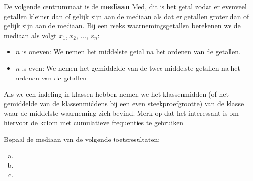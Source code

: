 \documentclass[12pt,twoside,a4paper]{article}
\begin{document}
De volgende centrummaat is de {\bf mediaan} Med, dit is het getal zodat er evenveel getallen kleiner dan of gelijk zijn aan de mediaan als dat er getallen groter dan of gelijk zijn aan de mediaan. Bij een reeks waarnemingsgetallen berekenen we de mediaan als volgt $x_1$, $x_2$, $\ldots$, $x_n$:
\begin{itemize}
  \item $n$ is oneven: We nemen het middelste getal na het ordenen van de getallen.
  \item $n$ is even: We nemen het gemiddelde van de twee middelste getallen na het ordenen van de getallen.
\end{itemize}
Als we een indeling in klassen hebben nemen we het klassenmidden (of het gemiddelde van de klassenmiddens bij een even steekproefgrootte) van de klasse waar de middelste waarneming zich bevind. Merk op dat het interessant is om hiervoor de kolom met cumulatieve frequenties te gebruiken.

\begin{oefening}
Bepaal de mediaan van de volgende toetsresultaten:
\begin{enumerate}[(a)]
  \item {}
  \item {}
  \item {}
\end{enumerate}
\end{oefening}
\end{document}
